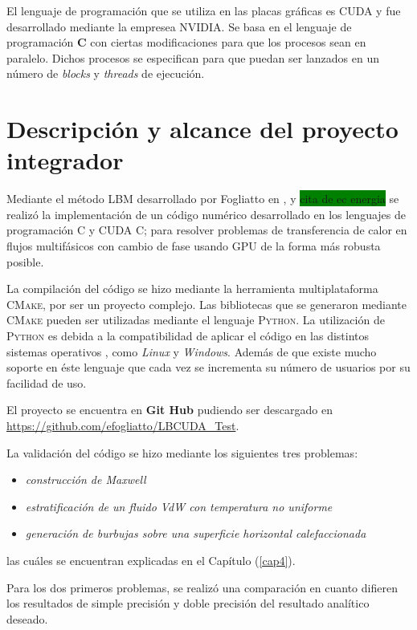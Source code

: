 El lenguaje de programación que se utiliza en las placas gráficas es CUDA y fue desarrollado mediante la empresea NVIDIA. Se basa en el lenguaje de programación \textbf{C} con ciertas modificaciones para que los procesos sean en paralelo. Dichos procesos se especifican para que puedan ser lanzados en un número de \textit{blocks} y \textit{threads} de ejecución.






\section{Descripción y alcance del proyecto integrador}

Mediante el método LBM desarrollado por Fogliatto en \cite{fogliatto2018modelado}, \cite{fogliatto2019simulation} y \colorbox{green}{cita de ec energia} se realizó la implementación de un código numérico desarrollado en los lenguajes de programación \textsc{C} y \textsc{CUDA C}; para resolver problemas de transferencia de calor en flujos multifásicos con cambio de fase usando GPU de la forma más robusta posible.

La compilación del código se hizo mediante la herramienta multiplataforma \textsc{CMake}, por ser un proyecto complejo. Las bibliotecas que se generaron mediante \textsc{CMake} pueden ser utilizadas mediante el lenguaje \textsc{Python}. La utilización de \textsc{Python} es debida a la compatibilidad de aplicar  el código en las distintos sistemas operativos , como \textit{Linux} y \textit{Windows}. Además de que existe mucho soporte en éste lenguaje que cada vez se incrementa su número de usuarios por su facilidad de uso.

El proyecto se encuentra en \textbf{Git Hub} pudiendo ser descargado en \url{ https://github.com/efogliatto/LBCUDA_Test}.


La validación del código se hizo mediante los siguientes tres problemas:
\begin{itemize}
	\item \textit{construcción de Maxwell}
	\item \textit{estratificación de un fluido VdW con temperatura no uniforme}
	\item \textit{generación de burbujas sobre una superficie horizontal calefaccionada}
\end{itemize} 

las cuáles se encuentran explicadas en el Capítulo (\ref{cap4}).

Para los dos primeros problemas, se realizó una comparación en cuanto difieren los resultados de simple precisión y doble precisión del resultado analítico deseado. 

